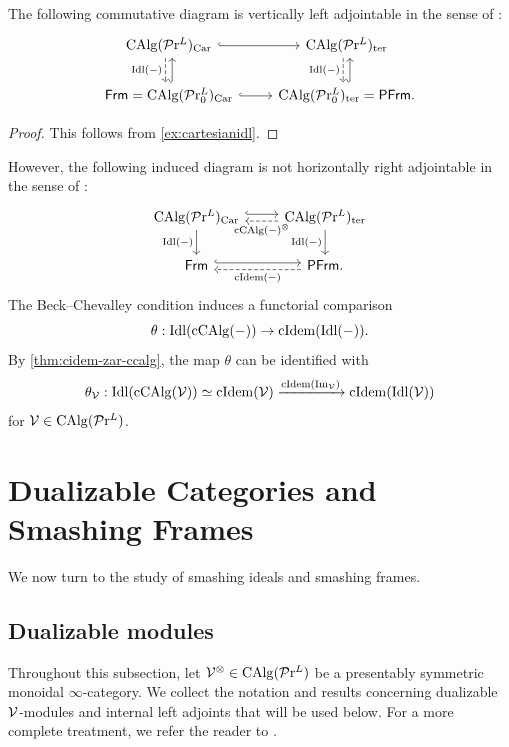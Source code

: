 \documentclass[10pt,a4paper,oneside]{article}
\begin{document}
\begin{prop}\label{prop:comparisoncidem}
The following commutative diagram is vertically left adjointable in the sense of \cite[Definition 4.7.4.13]{ha}:
$$
\begin{tikzcd}
\calg(\prl)_{\op{Car}} \arrow[d, "\idl(-)"', dashed, shift right] \arrow[r, hook] & \calg(\prl)_{\op{ter}} \arrow[d, "\idl(-)"', dashed, shift right] \\
\frm=\calg(\prl_0)_{\op{Car}} \arrow[r, hook] \arrow[u, hook, shift right]                   & \calg(\prl_0)_{\op{ter}}=\pfrm. \arrow[u, hook, shift right]                  
\end{tikzcd}$$

\end{prop}
\begin{proof}
This follows from \cref{ex:cartesianidl}.
\end{proof}

\begin{rem}
However, the following induced diagram is not horizontally right adjointable in the sense of \cite[Definition 4.7.4.13]{ha}: 
$$\begin{tikzcd}
\calg(\prl)_{\op{Car}} \arrow[d, "\idl(-)"'] \arrow[r, hook, shift left] & \calg(\prl)_{\op{ter}} \arrow[d, "\idl(-)"'] \arrow[l, "\op{cCAlg}(-)^\otimes", dashed, shift left] \\
\frm \arrow[r, hook, shift left]                     & \pfrm. \arrow[l, "\cidem(-)", dashed, shift left]                             
\end{tikzcd}$$
The Beck--Chevalley condition induces a functorial comparison
\[
\theta:\operatorname{Idl}(\operatorname{cCAlg}(-))\to \operatorname{cIdem}(\operatorname{Idl}(-)).
\]
By \cref{thm:cidem-zar-ccalg}, the map $\theta$ can be identified with $$\theta_\mathcal{V}:\operatorname{Idl}(\operatorname{cCAlg}(\mathcal{V})) \simeq \operatorname{cIdem}(\mathcal{V}) \xrightarrow{\operatorname{cIdem}(\operatorname{Im}_\mathcal{V})}\operatorname{cIdem}(\operatorname{Idl}(\mathcal{V}))$$
for $\mathcal{V}\in \operatorname{CAlg}(\mathcal{P}\mathrm{r}^L)$.
\end{rem}


\section{Dualizable Categories and Smashing Frames}\label{sec:dualizable}
We now turn to the study of smashing ideals and smashing frames.

\subsection{Dualizable modules}
Throughout this subsection, let $\mathcal{V}^\otimes \in \operatorname{CAlg}(\mathcal{P}\mathrm{r}^L)$ be a presentably symmetric monoidal $\infty$-category. We collect the notation and results concerning dualizable $\mathcal{V}$-modules and internal left adjoints that will be used below. For a more complete treatment, we refer the reader to \cite{ramzi2024dualizable,ramzi2024locally}.
\end{document}

